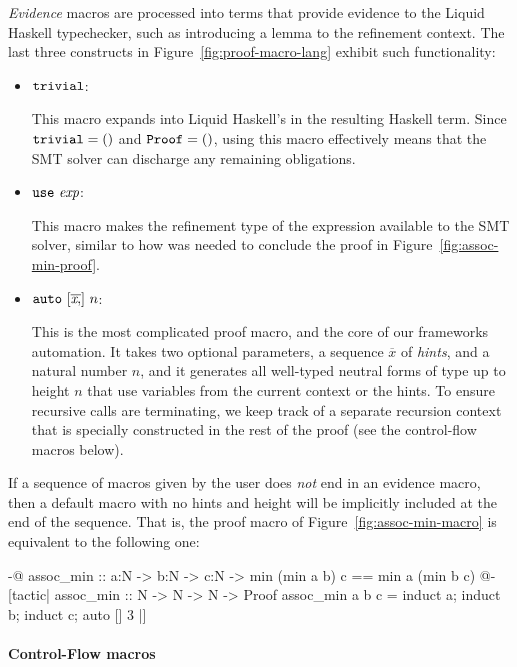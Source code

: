 \textit{Evidence} macros are processed into terms that provide
evidence to the Liquid Haskell typechecker, such as introducing a
lemma to the refinement context. The last three constructs in
Figure~\ref{fig:proof-macro-lang} exhibit such functionality:

\begin{itemize}

\item $\mathtt{trivial}$:

  This macro expands into Liquid Haskell's  in
  the resulting Haskell term. Since $\mathtt{trivial} = \mathtt{()}$ and
  $\mathtt{Proof} = \mathtt{()}$, using this macro effectively means that the
  SMT solver can discharge any remaining obligations.

\item $\mathtt{use} ~ \textit{exp}$:

  This macro makes the refinement type of the expression available
  to the SMT solver, similar to how  was needed
  to conclude the proof in Figure~\ref{fig:assoc-min-proof}.
  
\item $\mathtt{auto} ~ [\overline{\textit{x} ,}] ~ n$:

  This is the most complicated proof macro, and the core of our
  frameworks automation. It takes two optional parameters, a sequence
  $\overline{\textit{x}}$ of {\em hints}, and a natural number $n$,
  and it generates all well-typed neutral forms of type  up
  to height $n$ that use variables from the current context or the
  hints. To ensure recursive calls are terminating, we keep track of a
  separate recursion context that is specially constructed in the rest
  of the proof (see the control-flow macros below).
\end{itemize}

If a sequence of macros given by the user does {\em not} end in an
evidence macro, then a default  macro with no hints and height
 will be implicitly included at the end of the sequence. That is,
the proof macro of Figure~\ref{fig:assoc-min-macro} is equivalent to
the following one:
\begin{code}
  {-@ assoc_min :: a:N -> b:N -> c:N ->
        {min (min a b) c == min a (min b c)} @-}
  [tactic|
    assoc_min :: N -> N -> N -> Proof
    assoc_min a b c = induct a; induct b; induct c; auto [] 3
  |]
\end{code}

\paragraph*{Control-Flow macros}


